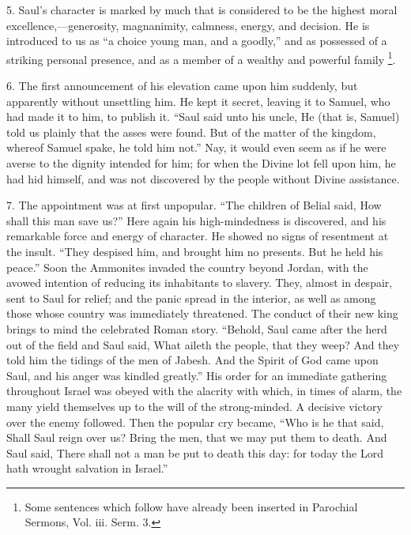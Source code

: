 5. Saul's character is marked by much that is considered to be the
highest moral excellence,—generosity, magnanimity, calmness, energy,
and decision. He is introduced to us as ``a choice young man, and
a goodly,'' and as possessed of a striking personal presence, and
as a member of a wealthy and powerful family \footnote{Some sentences which follow have already been inserted in Parochial
Sermons, Vol. iii. Serm. 3.}.

6. The first announcement of his elevation came upon him suddenly,
but apparently without unsettling him. He kept it secret, leaving it
to Samuel, who had made it to him, to publish it. ``Saul said unto
his uncle, He (that is, Samuel) told us plainly that the asses were
found. But of the matter of the kingdom, whereof Samuel spake, he told
him not.'' Nay, it would even seem as if he were averse to the
dignity intended for him; for when the Divine lot fell upon him, he
had hid himself, and was not discovered by the people without Divine
assistance.

7. The appointment was at first unpopular. ``The children of
Belial said, How shall this man save us?'' Here again his
high-mindedness is discovered, and his remarkable force and energy of
character. He showed no signs of resentment at the insult. ``They
despised him, and brought him no presents. But he held his
peace.'' Soon the Ammonites invaded the country beyond Jordan,
with the avowed intention of reducing its inhabitants to slavery.
They, almost in despair, sent to Saul for relief; and the panic spread
in the interior, as well as among those whose country was immediately
threatened. The conduct of their new king brings to mind the
celebrated Roman story. ``Behold, Saul came after the herd out of
the field and Saul said, What aileth the people, that they weep? And
they told him the tidings of the men of Jabesh. And the Spirit of God
came upon Saul, and his anger was kindled greatly.'' His order for
an immediate gathering throughout Israel was obeyed with the alacrity
with which, in times of alarm, the many yield themselves up to the
will of the strong-minded. A decisive victory over the enemy followed.
Then the popular cry became, ``Who is he that said, Shall Saul
reign over us? Bring the men, that we may put them to death. And Saul
said, There shall not a man be put to death this day: for today the
Lord hath wrought salvation in Israel.''

